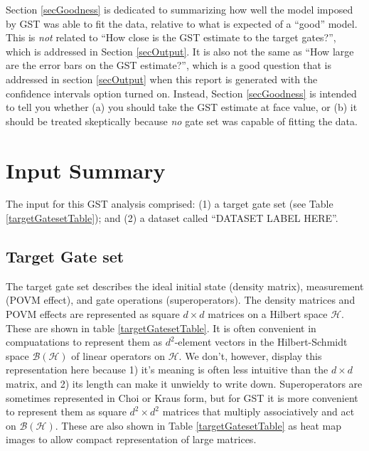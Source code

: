 \documentclass{article}[11pt]
\newcommand{\putfield}[2]{#2}
\begin{document}
Section \ref{secGoodness} is dedicated to summarizing how well the model imposed by GST was able to fit the data, relative to what is expected of a ``good'' model.  This is \emph{not} related to ``How close is the GST estimate to the target gates?'', which is addressed in Section \ref{secOutput}.  It is also not the same as ``How large are the error bars on the GST estimate?'', which is a good question that is addressed in section \ref{secOutput} when this report is generated with the confidence intervals option turned on.  Instead, Section \ref{secGoodness} is intended to tell you whether (a) you should take the GST estimate at face value, or (b) it should be treated skeptically because \emph{no} gate set was capable of fitting the data.


\section{Input Summary\label{secInput}}
The input for this GST analysis comprised: (1) a target gate set (see Table \ref{targetGatesetTable}); and (2) a dataset called ``\putfield{datasetLabel}{DATASET LABEL HERE}''.

\subsection{Target Gate set}

The target gate set describes the ideal initial state (density matrix), measurement (POVM effect), and gate operations (superoperators).  The density matrices and POVM effects are represented as square $d\times d$ matrices on a Hilbert space $\mathcal{H}$.  These are shown in table \ref{targetGatesetTable}.  It is often convenient in compuatations to represent them as $d^2$-element vectors in the Hilbert-Schmidt space $\mathcal{B}(\mathcal{H})$ of linear operators on $\mathcal{H}$.  We don't, however, display this representation here because 1) it's meaning is often less intuitive than the $d\times d$ matrix, and 2) its length can make it unwieldy to write down.  Superoperators are sometimes represented in Choi or Kraus form, but for GST it is more convenient to represent them as square $d^2\times d^2$ matrices that multiply associatively and act on $\mathcal{B}(\mathcal{H})$.  These are also shown in Table \ref{targetGatesetTable} as heat map images to allow compact representation of large matrices.
\end{document}
